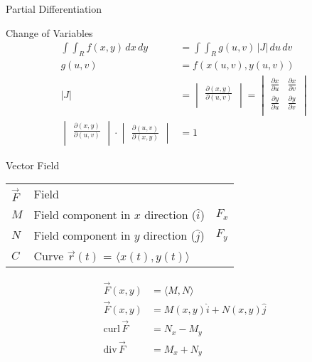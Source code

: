 \begin{section}{Partial Differentiation}
  \begin{section}{Change of Variables}
    \begin{align*}
      \int\int_R{f(x,y) \,dx \,dy} &=\int\int_R{g(u,v)\, |J| \,du \,dv} \\
      g(u,v) &= f(x(u,v),y(u,v)) \\
      |J| &=
            \begin{vmatrix}
              \frac{\partial{(x,y)}}{\partial{(u,v)}}\\
            \end{vmatrix} =
      \begin{vmatrix}
        \frac{\partial{x}}{\partial{u}} & \frac{\partial{x}}{\partial{v}}\\
        \frac{\partial{y}}{\partial{u}} & \frac{\partial{y}}{\partial{v}}\\
      \end{vmatrix} \\
      \begin{vmatrix}
        \frac{\partial{(x,y)}}{\partial{(u,v)}}\\
      \end{vmatrix}
      \cdot
      \begin{vmatrix}
        \frac{\partial{(u,v)}}{\partial{(x,y)}}
      \end{vmatrix}
      &= 1
    \end{align*}
  \end{section}

  \begin{section}{Vector Field}
    \begin{tabular}{l l l}
     $\vec{F}$ & Field & \\
     $M$ & Field component in $x$ direction ($\hat{i}$) & $F_x$ \\
     $N$ & Field component in $y$ direction ($\hat{j}$) & $F_y$ \\
     $C$ & Curve $\vec{r}(t)$ = $ \langle x(t),y(t) \rangle $ & \\
   \end{tabular}
    \begin{align*}
      \vec{F}(x,y) &= \langle M,N \rangle \\
      \vec{F}(x,y) &= M(x,y)\hat{i} + N(x,y)\hat{j}\\
      \text{curl}\,\vec{F} &= N_x - M_y  \\
      \text{div}\,\vec{F} &= M_x + N_y  \\
    \end{align*}
  \end{section}


\end{section}
